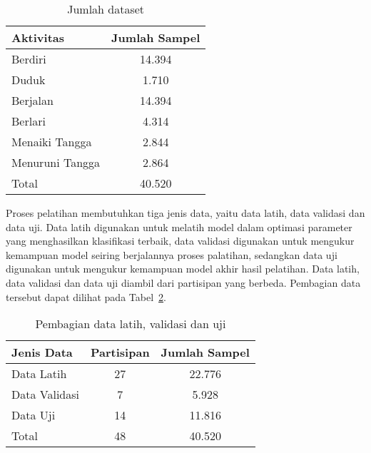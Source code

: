 \begin{table}[h!]
    \centering
    \caption{Jumlah dataset}
    \begin{tabular}{ |l|c| }
        \hline
        Aktivitas & Jumlah Sampel \\

        \hline
        Berdiri & 14.394 \\

        \hline
        Duduk & 1.710 \\

        \hline
        Berjalan & 14.394 \\

        \hline
        Berlari & 4.314 \\

        \hline
        Menaiki Tangga & 2.844 \\

        \hline
        Menuruni Tangga & 2.864 \\

        \hline
        Total & 40.520 \\

        \hline
    \end{tabular}
    \label{table:jumlah-dataset}
\end{table}

Proses pelatihan membutuhkan tiga jenis data, yaitu data latih, data validasi dan data uji. Data latih digunakan untuk melatih model dalam optimasi parameter yang menghasilkan klasifikasi terbaik, data validasi digunakan untuk mengukur kemampuan model seiring berjalannya proses palatihan, sedangkan data uji digunakan untuk mengukur kemampuan model akhir hasil pelatihan. Data latih, data validasi dan data uji diambil dari partisipan yang berbeda. Pembagian data tersebut dapat dilihat pada Tabel~\ref{table:pembagian-data}.

\begin{table}[h!]
    \centering
    \caption{Pembagian data latih, validasi dan uji}
    \begin{tabular}{ |l|c|c| }
        \hline
        Jenis Data & Partisipan & Jumlah Sampel \\

        \hline
        Data Latih & 27 & 22.776 \\

        \hline
        Data Validasi & 7 & 5.928 \\

        \hline
        Data Uji & 14 & 11.816 \\

        \hline
        Total & 48 & 40.520 \\

        \hline
    \end{tabular}
    \label{table:pembagian-data}
\end{table}

